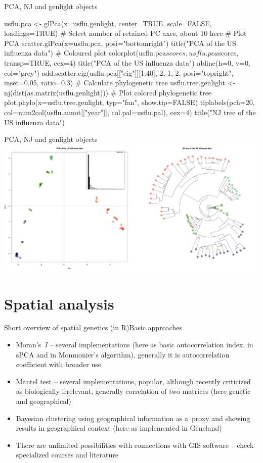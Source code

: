 \documentclass[compress, ucs, xelatex, 11pt, xcolor=svgnames,
  hyperref={
    bookmarks=true,
    unicode=true,
    colorlinks=true,
    pdftitle={Molecular data in R},
    plainpages=false,
    pdfauthor={Vojtech Zeisek},
    pdfsubject={Course about phylogeny and evolution in R},
    pdfcreator={XeLaTeX},
    pdfkeywords={R, evolution, phylogeny, molecular data},
    linkcolor=Tomato,
    anchorcolor=SaddleBrown,
    citecolor=Goldenrod,
    filecolor=DarkMagenta,
    menucolor=Sienna,
    urlcolor=DarkTurquoise,
    pdftex},
  url={hyphens, lowtilde} %
  ]{beamer}
\begin{document}
\begin{frame}[fragile]{PCA, NJ and genlight objects}
  \begin{spluscode}
    usflu.pca <- glPca(x=usflu.genlight, center=TRUE, scale=FALSE,
      loadings=TRUE) # Select number of retained PC axes, about 10 here
    # Plot PCA
    scatter.glPca(x=usflu.pca, posi="bottomright")
    title("PCA of the US influenza data")
    # Coloured plot
    colorplot(usflu.pca$scores, usflu.pca$scores, transp=TRUE, cex=4)
    title("PCA of the US influenza data")
    abline(h=0, v=0, col="grey")
    add.scatter.eig(usflu.pca[["eig"]][1:40], 2, 1, 2, posi="topright",
      inset=0.05, ratio=0.3)
    # Calculate phylogenetic tree
    usflu.tree.genlight <- nj(dist(as.matrix(usflu.genlight)))
    # Plot colored phylogenetic tree
    plot.phylo(x=usflu.tree.genlight, typ="fan", show.tip=FALSE)
    tiplabels(pch=20, col=num2col(usflu.annot[["year"]],
      col.pal=usflu.pal), cex=4)
    title("NJ tree of the US influenza data")
  \end{spluscode}
\end{frame}

\begin{frame}{PCA, NJ and genlight objects}
\includegraphics[width=\textwidth]{flu_pcoa_nj.png}
\end{frame}

\section{Spatial analysis}

\begin{frame}{Short overview of spatial genetics (in R)}{Basic approaches}
\begin{itemize}
  \item Moran's~\textit{I} -- several implementations (here as basic autocorrelation index, in sPCA and in Monmonier's algorithm), generally it is autocorrelation coefficient with broader use
  \item Mantel test -- several implementations, popular, although recently criticized as biologically irrelevant, generally correlation of two matrices (here genetic and geographical)
  \item Bayesian clustering using geographical information as a~proxy and showing results in geographical context (here as implemented in Geneland)
  \item There are unlimited possibilities with connections with GIS software -- check specialized courses and literature
\end{itemize}
\end{frame}
\end{document}
